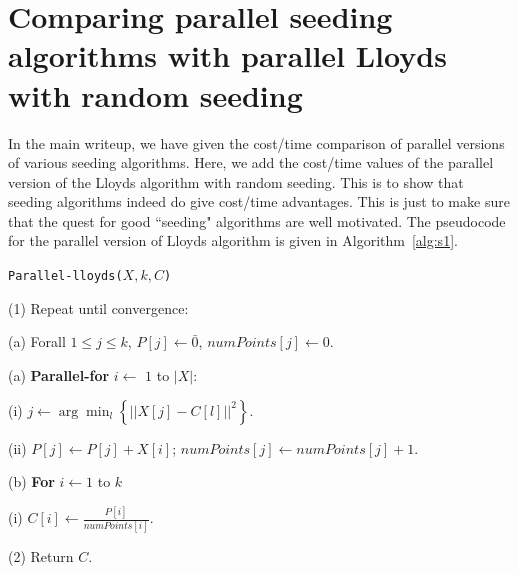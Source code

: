 \documentclass{article} %
\begin{document}
\section{Comparing parallel seeding algorithms with parallel Lloyds with random seeding}
In the main writeup, we have given the cost/time comparison of parallel versions of various seeding algorithms.
Here, we add the cost/time values of the parallel version of the Lloyds algorithm with random seeding.
This is to show that seeding algorithms indeed do give cost/time advantages.
This is just to make sure that the quest for good ``seeding" algorithms are well motivated. 
The pseudocode for the parallel version of Lloyds algorithm is given in Algorithm~\ref{alg:s1}.



\begin{center}
\begin{Algorithm}[ht]
\begin{boxedminipage}{5.6in}
{\tt Parallel-lloyds($X, k, C$)}

\hspace{0.1in} (1) Repeat until convergence:

\hspace{0.3in} (a) Forall $1 \leq j \leq k$, $P[j] \leftarrow \bar{0}$, $numPoints[j] \leftarrow 0$.

\hspace{0.3in} (a) {\bf Parallel-for} $i \leftarrow $ $1$ to $|X|$:

\hspace{0.5in} (i) $j \leftarrow \arg\min_{l} \left\{ ||X[j] - C[l]||^2 \right\}$.

\hspace{0.5in} (ii) $P[j] \leftarrow P[j] + X[i]$; $numPoints[j] \leftarrow numPoints[j] + 1$.

\hspace{0.3in} (b) {\bf For} $i \leftarrow 1$ to $k$

\hspace{0.5in} (i) $C[i] \leftarrow \frac{P[i]}{numPoints[i]}$.

\hspace{0.1in} (2) Return $C$.
 \end{boxedminipage}
\caption{The parallel version of the Lloyds algorithm.}
\label{alg:s1}
\end{Algorithm}
\end{center}
\end{document}
